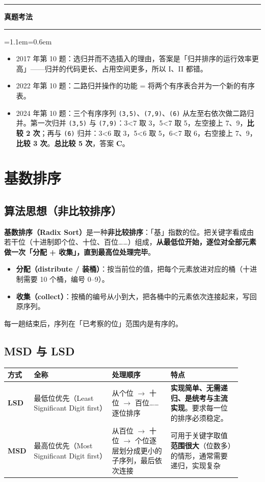 \documentclass[11pt,openany,UTF8]{ctexbook}
\newcommand{\callouthead}[2]{%
  \par\addvspace{7pt}\noindent
  {\color{#1}\rule[-0.15em]{3pt}{1.05em}}\hspace{0.5em}%
  {\bfseries\color{#1}#2}\par\nobreak\vspace{-0.35em}%
  {\color{rulesep}\hrule height 0.4pt}\nobreak\vspace{0.45em}%
  \begingroup\small\setlength{\parindent}{0pt}%
  \leftskip=1.1em\rightskip=0.6em\noindent\ignorespaces}
\newcommand{\calloutend}{\par\endgroup\addvspace{7pt}}
\newenvironment{callexam}[1]{\callouthead{exambar}{#1}}{\calloutend}
\begin{document}
\begin{callexam}{真题考法}
\begin{itemize}
\item 2017 年第 10 题：选归并而不选插入的理由，答案是「归并排序的运行效率更高」——归并的代码更长、占用空间更多，所以 I、II 都错。
\item 2022 年第 10 题：二路归并操作的功能 = 将两个有序表合并为一个新的有序表。
\item 2024 年第 10 题：三个有序序列 \texttt{(3,\allowbreak{}5)\allowbreak{}}、\texttt{(7,\allowbreak{}9)\allowbreak{}}、\texttt{(6)\allowbreak{}} 从左至右依次做二路归并。第一次归并 \texttt{(3,\allowbreak{}5)\allowbreak{}} 与 \texttt{(7,\allowbreak{}9)\allowbreak{}}：3<7 取 3，5<7 取 5，左空接上 7、9，\textbf{比较 2 次}；再与 \texttt{(6)\allowbreak{}} 归并：3<6 取 3，5<6 取 5，6<7 取 6，右空接上 7、9，\textbf{比较 3 次}。\textbf{总比较 5 次}，答案 \textbf{C}。
\end{itemize}
\end{callexam}

\section{基数排序}

\subsection{算法思想（非比较排序）}

\textbf{基数排序（Radix Sort）}是一种\textbf{非比较排序}：「基」指数的位。把关键字看成由若干位（十进制即个位、十位、百位……）组成，\textbf{从最低位开始，逐位对全部元素做一次「分配 + 收集」，直到最高位处理完毕}。

\begin{itemize}
\item \textbf{分配（distribute / 装桶）}：按当前位的值，把每个元素放进对应的桶（十进制需要 10 个桶，编号 0–9）。
\item \textbf{收集（collect）}：按桶的编号从小到大，把各桶中的元素依次连接起来，写回原序列。
\end{itemize}
每一趟结束后，序列在「已考察的位」范围内是有序的。

\subsection{MSD 与 LSD}

\begingroup\small\setlength{\tabcolsep}{4.0pt}
\begin{longtable}{@{}L{0.0533\linewidth}L{0.3245\linewidth}L{0.2401\linewidth}L{0.2934\linewidth}@{}}
\toprule
\textbf{方式} & \textbf{全称} & \textbf{处理顺序} & \textbf{特点} \\
\midrule
\endhead
\textbf{LSD} & 最低位优先（Least Significant Digit first） & 从个位 $\to$ 十位 $\to$ 百位……逐位排序 & \textbf{实现简单、无需递归、是统考与主流实现}。要求每一位的排序必须稳定。 \\
\textbf{MSD} & 最高位优先（Most Significant Digit first） & 从百位 $\to$ 十位 $\to$ 个位逐层划分成更小的子序列，最后依次连接 & 可用于关键字取值\textbf{范围很大}（位数多）的情形，通常需要递归，实现复杂 \\
\bottomrule
\end{longtable}
\endgroup
\end{document}
